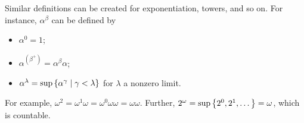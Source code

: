 Similar definitions can be created for exponentiation, towers, and so on.
For instance, \( \alpha^\beta \) can be defined by
\begin{itemize}
    \item \( \alpha^0 = 1 \);
    \item \( \alpha^{(\beta^+)} = \alpha^\beta \alpha \);
    \item \( \alpha^\lambda = \sup\qty{\alpha^\gamma \mid \gamma < \lambda} \) for \( \lambda \) a nonzero limit.
\end{itemize}
For example, \( \omega^2 = \omega^1 \omega = \omega^0 \omega \omega = \omega \omega \).
Further, \( 2^\omega = \sup\qty{2^0, 2^1, \dots} = \omega \), which is countable.
